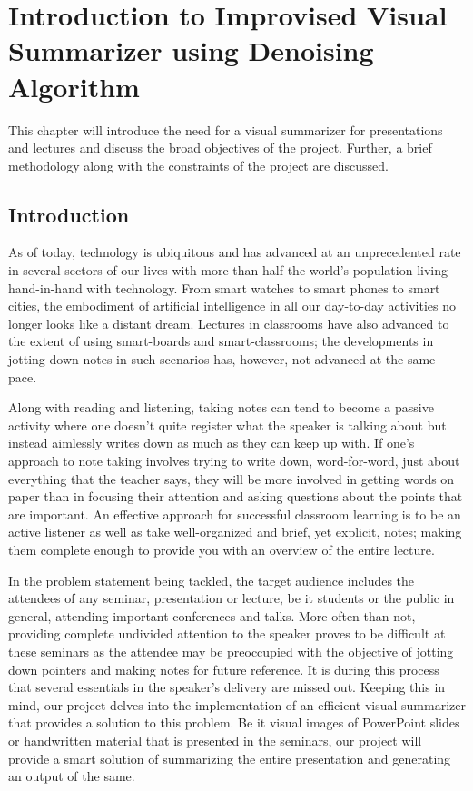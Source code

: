 \chapter{Introduction to Improvised Visual Summarizer using Denoising Algorithm}
This chapter will introduce the need for a visual summarizer for presentations and lectures and discuss the broad objectives of the project. Further, a brief methodology along with the constraints of the project are discussed. 
\section[Introduction]{\textbf{Introduction}}
As of today, technology is ubiquitous and has advanced at an unprecedented rate in several sectors of our lives with more than half the world’s population living hand-in-hand with technology. From smart watches to smart phones to smart cities, the embodiment of artificial intelligence in all our day-to-day activities no longer looks like a distant dream. Lectures in classrooms have also advanced to the extent of using smart-boards and smart-classrooms; the developments in jotting down notes in such scenarios has, however, not advanced at the same pace. 

Along with reading and listening, taking notes can tend to become  a passive activity where one doesn't quite register what the speaker is talking about but instead aimlessly writes down as much as they can keep up with. If one's approach to note taking involves trying to write down, word-for-word, just about everything that the teacher says, they will be more involved in getting words on paper than in focusing their attention and asking questions about the points that are important. An effective approach for successful classroom learning is to be an active listener as well as take well-organized and brief, yet explicit, notes; making them complete enough to provide you with an overview of the entire lecture.

In the problem statement being tackled, the target audience includes the attendees of any seminar, presentation or lecture, be it students or the public in general, attending important conferences and talks. More often than not, providing complete undivided attention to the speaker proves to be difficult at these seminars as the attendee may be preoccupied with the objective of jotting down pointers and making notes for future reference. It is during this process that several essentials in the speaker’s delivery are missed out. Keeping this in mind, our project delves into the implementation of an efficient visual summarizer that provides a solution to this problem. 
Be it visual images of PowerPoint slides or handwritten material that is presented in the seminars, our project will provide a smart solution of summarizing the entire presentation and generating an output of the same.


